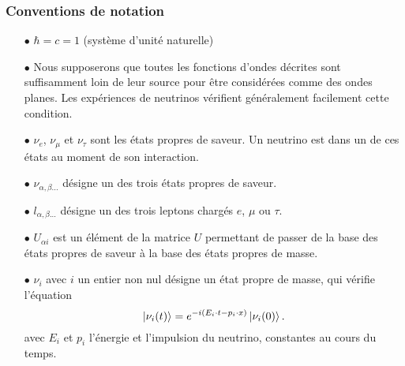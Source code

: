       \subsubsection{Conventions de notation}
        \begin{itemize}
          \item[$\bullet$] $\hbar = c = 1$ (système d'unité naturelle)
          \item[$\bullet$] Nous supposerons que toutes les fonctions d'ondes décrites sont suffisamment loin de leur source pour être considérées comme des ondes planes. Les expériences de neutrinos vérifient généralement facilement cette condition.
          \item[$\bullet$] $\nu_e$, $\nu_{\mu}$ et $\nu_{\tau}$ sont les états propres de saveur. Un neutrino est dans un de ces états au moment de son interaction.
          \item[$\bullet$] $\nu_{\alpha,\beta...}$ désigne un des trois états propres de saveur.
          \item[$\bullet$] $l_{\alpha,\beta...}$ désigne un des trois leptons chargés $e$, $\mu$ ou $\tau$.
          \item[$\bullet$] $U_{\alpha i}$ est un élément de la matrice $U$ permettant de passer de la base des états propres de saveur à la base des états propres de masse.
          \item[$\bullet$] $\nu_{i}$ avec $i$ un entier non nul désigne un état propre de masse, qui vérifie l'équation
          \begin{equation}
            \ket{\nu_i(t)} = e^{-i(E_i\cdot t - p_i\cdot x)}\ket{\nu_i(0)}.
          \end{equation}
          avec $E_i$ et $p_i$ l'énergie et l'impulsion du neutrino, constantes au cours du temps.
        \end{itemize}


